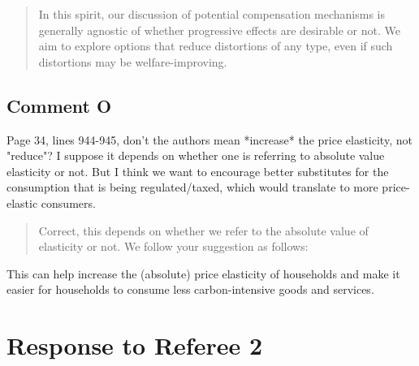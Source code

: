 \documentclass[11pt]{article}
\newenvironment{response}
{\begin{quote}\color{black}}
{\end{quote}}
\begin{document}
\begin{response}
    In this spirit, our discussion of potential compensation mechanisms is generally agnostic of whether progressive effects are desirable or not. We aim to explore options that reduce distortions of any type, even if such distortions may be welfare-improving.
\end{response}
        

\subsection*{Comment O}\label{comment_R1_O}

\begin{commentbox}
    Page 34, lines 944-945, don't the authors mean *increase* the price elasticity, not "reduce"? I suppose it depends on whether one is referring to absolute value elasticity or not. But I think we want to encourage better substitutes for the consumption that is being regulated/taxed, which would translate to more price-elastic consumers.
\end{commentbox}

\begin{response}
    Correct, this depends on whether we refer to the absolute value of elasticity or not. We follow your suggestion as follows:
\end{response}

\begin{revisionbox}
    This can help increase the (absolute) price elasticity of households and make it easier for households to consume less carbon-intensive goods and services.
\end{revisionbox}

\clearpage

\section*{Response to Referee 2}
\end{document}
